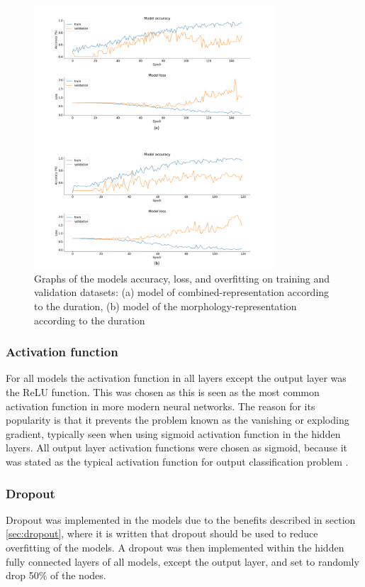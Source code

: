 \begin{figure} [H]
\centering
\includegraphics[width=0.8\textwidth]{figures/Graphs}
\caption{Graphs of the models accuracy, loss, and overfitting on training and validation datasets: (a) model of combined-representation according to the duration, (b) model of the morphology-representation according to the duration}
\label{fig:Graphs}
\end{figure}


\subsubsection{Activation function}
For all models the activation function in all layers except the output layer was the ReLU function. This was chosen as this is seen as the most common activation function in more modern neural networks. The reason for its popularity is that it prevents the problem known as the vanishing or exploding gradient, typically seen when using sigmoid activation function in the hidden layers.\citep{Goodfellow2016}   
All output layer activation functions were chosen as sigmoid, because it was stated as the typical activation function for output classification problem \citep{Duda2000}.

\subsubsection{Dropout}
Dropout was implemented in the models due to the benefits described in section \ref{sec:dropout}, where it is written that dropout should be used to reduce overfitting of the models. A dropout was then implemented within the hidden fully connected layers of all models, except the output layer, and set to randomly drop 50\% of the nodes. 


